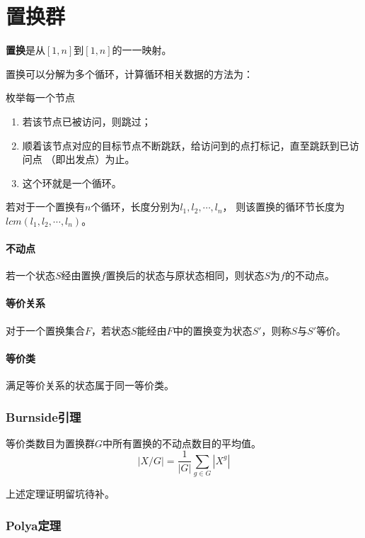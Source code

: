 \section{置换群}
{\bfseries 置换}是从$[1,n]$到$[1,n]$的一一映射。

置换可以分解为多个循环，计算循环相关数据的方法为：

枚举每一个节点
\begin{enumerate}
	\item 若该节点已被访问，则跳过；
	\item 顺着该节点对应的目标节点不断跳跃，给访问到的点打标记，直至跳跃到已访问点
	      （即出发点）为止。
	\item 这个环就是一个循环。
\end{enumerate}
\begin{theorem}
	若对于一个置换有$n$个循环，长度分别为$l_1,l_2,\cdots,l_n$，
	则该置换的循环节长度为$lcm(l_1,l_2,\cdots,l_n)$。
\end{theorem}
\paragraph{不动点}
若一个状态$S$经由置换$f$置换后的状态与原状态相同，则状态$S$为$f$的不动点。
\paragraph{等价关系}
对于一个置换集合$F$，若状态$S$能经由$F$中的置换变为状态$S'$，则称$S$与$S'$等价。
\paragraph{等价类}
满足等价关系的状态属于同一等价类。

\subsubsection{Burnside引理}
\begin{lemma}
	等价类数目为置换群$G$中所有置换的不动点数目的平均值。
	\begin{displaymath}
		|X/G|=\frac{1}{|G|}\sum_{g\in G}|X^g|
	\end{displaymath}
\end{lemma}
上述定理证明留坑待补。
\subsubsection{Polya定理}

